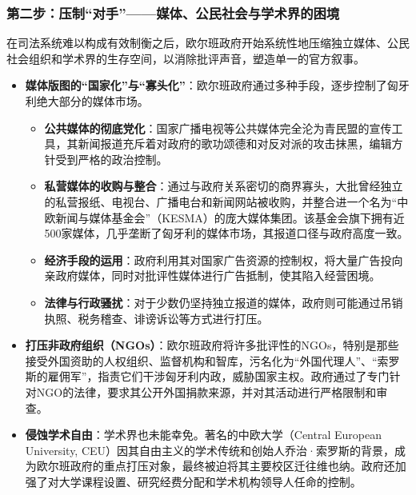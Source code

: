 \documentclass[UTF8, 10pt]{ctexbook}
\begin{document}
\subsubsection{第二步：压制“对手”——媒体、公民社会与学术界的困境}
在司法系统难以构成有效制衡之后，欧尔班政府开始系统性地压缩独立媒体、公民社会组织和学术界的生存空间，以消除批评声音，塑造单一的官方叙事。
\begin{itemize}
    \item \textbf{媒体版图的“国家化”与“寡头化”}：欧尔班政府通过多种手段，逐步控制了匈牙利绝大部分的媒体市场。
    \begin{itemize}
        \item \textbf{公共媒体的彻底党化}：国家广播电视等公共媒体完全沦为青民盟的宣传工具，其新闻报道充斥着对政府的歌功颂德和对反对派的攻击抹黑，编辑方针受到严格的政治控制。
        \item \textbf{私营媒体的收购与整合}：通过与政府关系密切的商界寡头，大批曾经独立的私营报纸、电视台、广播电台和新闻网站被收购，并整合进一个名为“中欧新闻与媒体基金会”（KESMA）的庞大媒体集团。该基金会旗下拥有近500家媒体，几乎垄断了匈牙利的媒体市场，其报道口径与政府高度一致。
        \item \textbf{经济手段的运用}：政府利用其对国家广告资源的控制权，将大量广告投向亲政府媒体，同时对批评性媒体进行广告抵制，使其陷入经营困境。
        \item \textbf{法律与行政骚扰}：对于少数仍坚持独立报道的媒体，政府则可能通过吊销执照、税务稽查、诽谤诉讼等方式进行打压。
    \end{itemize}
    \item \textbf{打压非政府组织（NGOs）}：欧尔班政府将许多批评性的NGOs，特别是那些接受外国资助的人权组织、监督机构和智库，污名化为“外国代理人”、“索罗斯的雇佣军”，指责它们干涉匈牙利内政，威胁国家主权。政府通过了专门针对NGO的法律，要求其公开外国捐款来源，并对其活动进行严格限制和审查。
    \item \textbf{侵蚀学术自由}：学术界也未能幸免。著名的中欧大学（Central European University, CEU）因其自由主义的学术传统和创始人乔治·索罗斯的背景，成为欧尔班政府的重点打压对象，最终被迫将其主要校区迁往维也纳。政府还加强了对大学课程设置、研究经费分配和学术机构领导人任命的控制。
\end{itemize}
    
\end{document}
